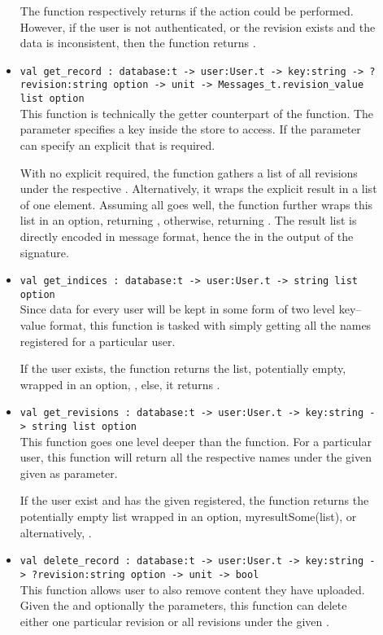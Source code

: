 \begin{description}
\begin{itemize}
  The function respectively returns  if the action could be performed. However, if the user is not authenticated, or the revision exists and the data is inconsistent, then the function returns .

  \item \verb|val get_record : database:t -> user:User.t -> key:string -> ?revision:string option -> unit -> Messages_t.revision_value list option| \\
  This function is technically the getter counterpart of the  function.
  The  parameter specifies a key inside the store to access.
  If the  parameter can specify an explicit  that is required.

  With no explicit  required, the function gathers a list of all revisions under the respective . Alternatively, it wraps the explicit result in a list of one element. Assuming all goes well, the function further wraps this list in an option, returning , otherwise, returning . The result list is directly encoded in message format, hence the  in the output of the signature.

  \item \verb|val get_indices : database:t -> user:User.t -> string list option| \\
  Since data for every user will be kept in some form of two level key--value format, this function is tasked with simply getting all the  names registered for a particular user.

  If the user exists, the function returns the list, potentially empty, wrapped in an option, , else, it returns .

  \item \verb|val get_revisions : database:t -> user:User.t -> key:string -> string list option| \\
  This function goes one level deeper than the  function.
  For a particular user, this function will return all the respective  names under the given  given as parameter.

  If the user exist and has the given  registered, the function returns the potentially empty list wrapped in an option, myresult{Some(list)}, or alternatively, .

  \item \verb|val delete_record : database:t -> user:User.t -> key:string -> ?revision:string option -> unit -> bool| \\
  This function allows user to also remove content they have uploaded.
  Given the  and optionally the  parameters, this function can delete either one particular revision or all revisions under the given .


\end{itemize}
\end{description}
